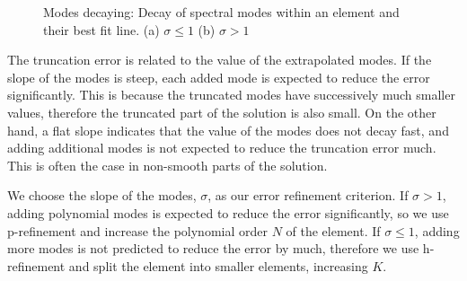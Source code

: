 \begin{figure}[H]
    \centering
    \hfill
    \caption{Modes decaying: Decay of spectral modes within an element and their best fit line. (a) \(\sigma \leqslant 1\) (b) \(\sigma > 1\)}\label{fig:decaying_modes}
\end{figure}

The truncation error is related to the value of the extrapolated modes. If the slope of the modes is
steep, each added mode is expected to reduce the error significantly. This is because the truncated
modes have successively much smaller values, therefore the truncated part of the solution is also
small. On the other hand, a flat slope indicates that the value of the modes does not decay fast,
and adding additional modes is not expected to reduce the truncation error much. This is often the
case in non-smooth parts of the solution.

We choose the slope of the modes, \(\sigma \), as our error refinement criterion. If \(\sigma > 1\),
adding polynomial modes is expected to reduce the error significantly, so we use p-refinement and
increase the polynomial order \(N\) of the element. If \(\sigma \leqslant 1\), adding more modes is
not predicted to reduce the error by much, therefore we use h-refinement and split the element into
smaller elements, increasing \(K\).

